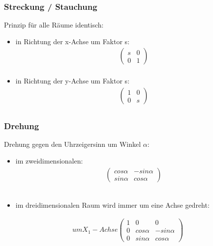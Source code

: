 \begin{frame}
	\frametitle{Streckung / Stauchung}
	Prinzip für alle Räume identisch:
	\begin{itemize}
		\item in Richtung der x-Achse um Faktor s: \begin{gather*} \begin{pmatrix}
			s & 0 \\
			0 & 1
			\end{pmatrix} \\ \end{gather*}
		\item in Richtung der y-Achse um Faktor s: \begin{gather*} \begin{pmatrix}
			1 & 0 \\
			0 & s
		\end{pmatrix} \\ \end{gather*}
	\end{itemize}
\end{frame}

\begin{frame}
	\frametitle{Drehung}
	Drehung gegen den Uhrzeigersinn um Winkel $\alpha$:
	\begin{itemize}
		\item im zweidimensionalen: \begin{gather*} \begin{pmatrix}
			cos{\alpha} & -sin{\alpha} \\
			sin{\alpha} & cos{\alpha}
			\end{pmatrix} \end{gather*} \\
		\item im dreidimensionalen Raum wird immer um eine Achse gedreht:
	\end{itemize}
		\begin{gather*} um X_{1}-Achse \begin{pmatrix}
			1 & 0 & 0 \\
			0 & cos{\alpha} & -sin{\alpha} \\
			0 & sin{\alpha} & cos{\alpha}
		\end{pmatrix} \end{gather*} \\

\end{frame}

